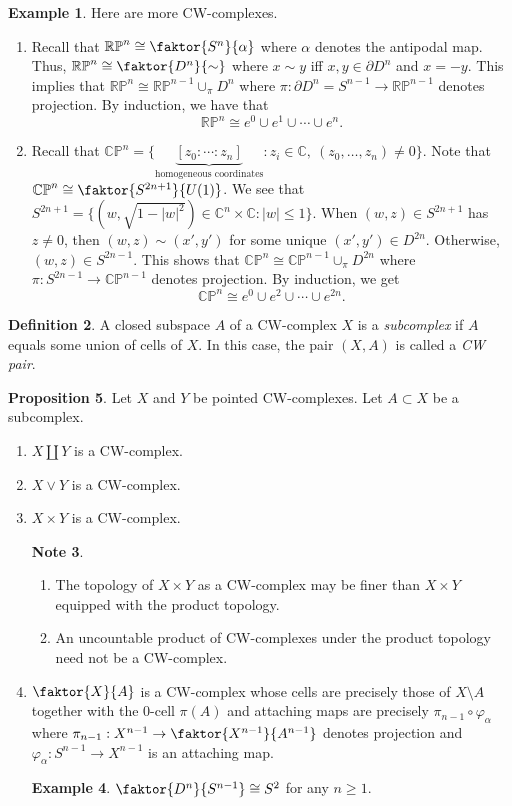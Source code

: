 \documentclass[10pt,letterpaper,cm]{nupset}
\theoremstyle{definition}
\newtheorem{definition}{Definition}[subsection]
\newtheorem{exmp}[definition]{Example}
\newtheorem{note}[definition]{Note}
\theoremstyle{theorem}
\newtheorem{prop}[definition]{Proposition}
\theoremstyle{remark}
\newcommand{\C}{\mathbb C}
\newcommand{\CP}{\mathbb{CP}}
\newcommand{\RP}{\mathbb{RP}}
\newcommand{\1}{\mathbb{1}}
\newcommand{\0}{\vec 0}
\begin{document}
\begin{exmp} Here are more CW-complexes.
\begin{enumerate}
\item Recall that $\RP^n \cong \faktor{S^n}{\alpha}$ where $\alpha$ denotes the antipodal map. Thus, $\RP^n \cong \faktor{D^n}{\sim}$ where $x\sim y$ iff $x,y\in \partial{D^n}$ and $x=-y$. This implies that $\RP^n \cong \RP^{n-1} \cup_{\pi} D^n$ where $\pi : \partial{D^n} = S^{n-1} \to \RP^{n-1}$ denotes projection. By induction, we have that $$\RP^n \cong e^0 \cup e^1 \cup \cdots \cup e^n.$$
\item Recall that $\CP^n = \{\underbrace{[z_0 : \cdots : z_n]}_{\text{homogeneous coordinates}} : z_i \in \C, \ (z_0, \ldots, z_n) \ne 0\}$. Note that $\CP^n \cong \faktor{S^{2n+1}}{U(1)}$.
We see that $S^{2n+1} = \{(w, \sqrt{1-|w|^2}) \in \C^n \times \C : |w| \leq 1\}$. When $(w,z) \in S^{2n+1}$ has $z\ne 0$, then $(w,z) \sim (x', y')$ for some unique $(x', y')\in D^{2n}$. Otherwise, $(w,z) \in S^{2n-1}$. This shows that $\CP^n \cong \CP^{n-1} \cup_{\pi} D^{2n}$ where $\pi : S^{2n-1} \to \CP^{n-1}$ denotes projection.  By induction, we get $$\CP^n \cong e^0 \cup e^2 \cup \cdots \cup e^{2n}.$$
\end{enumerate}
\end{exmp}

\begin{definition}
A closed subspace $A$ of a CW-complex $X$ is a \textit{subcomplex} if $A$ equals some union of cells of $X$. In this case, the pair $(X, A)$ is called a \textit{CW pair}.
\end{definition}

\begin{prop} Let $X$ and $Y$ be pointed CW-complexes. Let $A\subset X$ be a subcomplex.
\begin{enumerate}
\item $X\coprod Y$ is a CW-complex.
\item $X \vee Y$ is a CW-complex.
\item $X\times Y$ is a CW-complex.
\begin{note} $ $
\begin{enumerate}
\item The topology of $X \times Y$ as a CW-complex may be finer than $X\times Y$ equipped with the product topology. 
\item An uncountable product of CW-complexes under the product topology need not be a CW-complex.
\end{enumerate}
\end{note}
\item $\faktor{X}{A}$ is a CW-complex whose cells are precisely those of $X\setminus A$ together with the $0$-cell $\pi(A)$ and attaching maps are precisely $\pi_{n-1} \circ \varphi_{\alpha}$ where $\pi_{n-1} : X^{n-1} \to \faktor{X^{n-1}}{A^{n-1}}$ denotes projection and $\varphi_{\alpha} :S^{n-1} \to X^{n-1}$ is an attaching map. 
\begin{exmp}
$\faktor{D^n}{S^{n-1}} \cong S^2$ for any $n\geq 1$.
\end{exmp}
\end{enumerate}
\end{prop}
\end{document}
